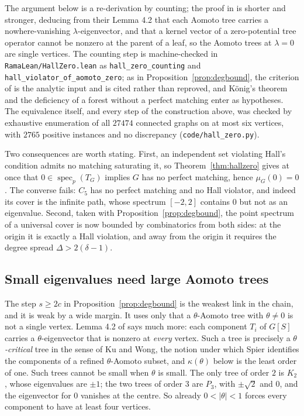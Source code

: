 \documentclass[11pt]{article}
\theoremstyle{remark}
\begin{document}
The argument below is a re-derivation by counting; the proof in \cite{BGM} is shorter and
stronger, deducing from their Lemma 4.2 that each Aomoto tree carries a nowhere-vanishing
$\lambda$-eigenvector, and that a kernel vector of a zero-potential tree operator cannot be nonzero
at the parent of a leaf, so the Aomoto trees at $\lambda=0$ are single vertices. The counting step
is machine-checked in \texttt{RamaLean/HallZero.lean} as
\texttt{hall\_zero\_counting} and \texttt{hall\_violator\_of\_aomoto\_zero}; as in
Proposition~\ref{prop:degbound}, the criterion of \cite{BGM} is the analytic input and is cited
rather than reproved, and K\"onig's theorem and the deficiency of a forest without a perfect
matching enter as hypotheses. The equivalence itself, and every step of the construction above, was
checked by exhaustive enumeration of all $27474$ connected graphs on at most six vertices, with
$2765$ positive instances and no discrepancy (\texttt{code/hall\_zero.py}).

Two consequences are worth stating. First, an independent set violating Hall's condition admits no
matching saturating it, so Theorem~\ref{thm:hallzero} gives at once that $0\in\operatorname{spec}_p
(T_G)$ implies $G$ has no perfect matching, hence $\mu_G(0)=0$. The converse fails: $C_5$ has no
perfect matching and no Hall violator, and indeed its cover is the infinite path, whose spectrum
$[-2,2]$ contains $0$ but not as an eigenvalue. Second, taken with
Proposition~\ref{prop:degbound}, the point spectrum of a universal cover is now bounded by
combinatorics from both sides: at the origin it is exactly a Hall violation, and away from the
origin it requires the degree spread $\Delta>2(\delta-1)$.

\subsection{Small eigenvalues need large Aomoto trees}\label{sec:kappa}

The step $s\ge2c$ in Proposition~\ref{prop:degbound} is the weakest link in the chain, and it is
weak by a wide margin. It uses only that a $\theta$-Aomoto tree with $\theta\ne0$ is not a single
vertex. Lemma 4.2 of \cite{BGM} says much more: each component $T_i$ of $G[S]$ carries a
$\theta$-eigenvector that is nonzero at \emph{every} vertex. Such a tree is precisely a
\emph{$\theta$-critical} tree in the sense of Ku and Wong, the notion under which Spier
\cite[Cor.~40]{Sp} identifies the components of a refined $\theta$-Aomoto subset, and
$\kappa(\theta)$ below is the least order of one. Such trees cannot be small when
$\theta$ is small. The only tree of order $2$ is $K_2$, whose eigenvalues are $\pm1$; the two trees
of order $3$ are $P_3$, with $\pm\sqrt2$ and $0$, and the eigenvector for $0$ vanishes at the
centre. So already $0<|\theta|<1$ forces every component to have at least four vertices.
\end{document}
